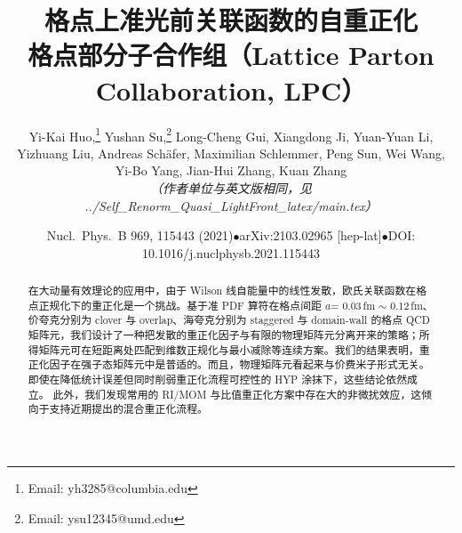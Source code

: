 \documentclass[11pt]{ctexart}
\title{\bf 格点上准光前关联函数的自重正化\\[1ex]
\large 格点部分子合作组（Lattice Parton Collaboration, LPC）}
\author{Yi-Kai Huo,\thanks{Email: yh3285@columbia.edu}
Yushan Su,\thanks{Email: ysu12345@umd.edu}
Long-Cheng Gui,
Xiangdong Ji,
Yuan-Yuan Li,
Yizhuang Liu,
Andreas Sch\"afer,
Maximilian Schlemmer,
Peng Sun,
Wei Wang,
Yi-Bo Yang,
Jian-Hui Zhang,
Kuan Zhang\\[1ex]
\normalsize\it （作者单位与英文版相同，见 ../Self\_Renorm\_Quasi\_LightFront\_latex/main.tex）}
\date{Nucl.\ Phys.\ B 969, 115443 (2021)\quad $\bullet$\quad arXiv:2103.02965 [hep-lat]\quad $\bullet$\quad DOI: 10.1016/j.nuclphysb.2021.115443}
\begin{document}
\begin{abstract}
在大动量有效理论的应用中，由于 Wilson 线自能量中的线性发散，欧氏关联函数在格点正规化下的重正化是一个挑战。基于准 PDF 算符在格点间距 $a$= 0.03\,fm $\sim$ 0.12\,fm、价夸克分别为 clover 与 overlap、海夸克分别为 staggered 与 domain-wall 的格点 QCD 矩阵元，我们设计了一种把发散的重正化因子与有限的物理矩阵元分离开来的策略；所得矩阵元可在短距离处匹配到维数正规化与最小减除等连续方案。我们的结果表明，重正化因子在强子态矩阵元中是普适的。而且，物理矩阵元看起来与价费米子形式无关。
即使在降低统计误差但同时削弱重正化流程可控性的 HYP 涂抹下，这些结论依然成立。
此外，我们发现常用的 RI/MOM 与比值重正化方案中存在大的非微扰效应，这倾向于支持近期提出的混合重正化流程。
\end{abstract}

\maketitle











\end{document}
